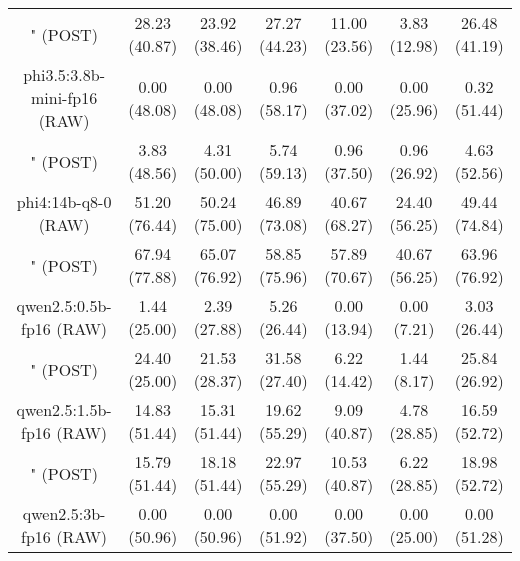 \begin{table}[]
{\begin{tabular}{ccccccc}
      \multicolumn{1}{c|}{" (POST)} & 28.23 (40.87) & 23.92 (38.46) & \multicolumn{1}{c|}{27.27 (44.23)} & 11.00 (23.56) & \multicolumn{1}{c|}{3.83 (12.98)} & 26.48 (41.19) \\
      \cline{1-7}

      \multicolumn{1}{c|}{phi3.5:3.8b-mini-fp16 (RAW)} & 0.00 (48.08) & 0.00 (48.08) & \multicolumn{1}{c|}{0.96 (58.17)} & 0.00 (37.02) & \multicolumn{1}{c|}{0.00 (25.96)} & 0.32 (51.44) \\

      \multicolumn{1}{c|}{" (POST)} & 3.83 (48.56) & 4.31 (50.00) & \multicolumn{1}{c|}{5.74 (59.13)} & 0.96 (37.50) & \multicolumn{1}{c|}{0.96 (26.92)} & 4.63 (52.56) \\
      \cline{1-7}

      \multicolumn{1}{c|}{phi4:14b-q8-0 (RAW)} & 51.20 (76.44) & 50.24 (75.00) & \multicolumn{1}{c|}{46.89 (73.08)} & 40.67 (68.27) & \multicolumn{1}{c|}{24.40 (56.25)} & 49.44 (74.84) \\

      \multicolumn{1}{c|}{" (POST)} & 67.94 (77.88) & 65.07 (76.92) & \multicolumn{1}{c|}{58.85 (75.96)} & 57.89 (70.67) & \multicolumn{1}{c|}{40.67 (56.25)} & 63.96 (76.92) \\
      \cline{1-7}

      \multicolumn{1}{c|}{qwen2.5:0.5b-fp16 (RAW)} & 1.44 (25.00) & 2.39 (27.88) & \multicolumn{1}{c|}{5.26 (26.44)} & 0.00 (13.94) & \multicolumn{1}{c|}{0.00 (7.21)} & 3.03 (26.44) \\

      \multicolumn{1}{c|}{" (POST)} & 24.40 (25.00) & 21.53 (28.37) & \multicolumn{1}{c|}{31.58 (27.40)} & 6.22 (14.42) & \multicolumn{1}{c|}{1.44 (8.17)} & 25.84 (26.92) \\
      \cline{1-7}

      \multicolumn{1}{c|}{qwen2.5:1.5b-fp16 (RAW)} & 14.83 (51.44) & 15.31 (51.44) & \multicolumn{1}{c|}{19.62 (55.29)} & 9.09 (40.87) & \multicolumn{1}{c|}{4.78 (28.85)} & 16.59 (52.72) \\

      \multicolumn{1}{c|}{" (POST)} & 15.79 (51.44) & 18.18 (51.44) & \multicolumn{1}{c|}{22.97 (55.29)} & 10.53 (40.87) & \multicolumn{1}{c|}{6.22 (28.85)} & 18.98 (52.72) \\
      \cline{1-7}

      \multicolumn{1}{c|}{qwen2.5:3b-fp16 (RAW)} & 0.00 (50.96) & 0.00 (50.96) & \multicolumn{1}{c|}{0.00 (51.92)} & 0.00 (37.50) & \multicolumn{1}{c|}{0.00 (25.00)} & 0.00 (51.28) \\


\end{tabular}}
\end{table}
